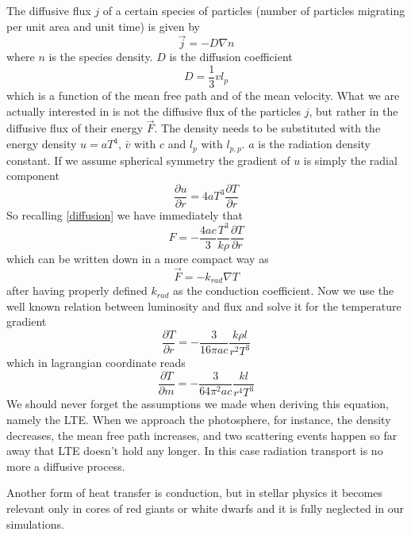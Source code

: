 The diffusive flux $j$ of a certain species of particles (number of particles migrating per unit area and unit time) is given by
\begin{equation}\label{diffusion}
	\vec  j=-D \nabla n
\end{equation}
where $n$ is the species density. $D$ is the diffusion coefficient
\begin{equation}
	D =\frac{1}{3} v l_{p}
\end{equation}
which is a function of the mean free path and of the mean velocity. What we are actually interested in is not the diffusive flux of the particles $j$, but rather in the diffusive flux of their energy $\vec F$. The density needs to be substituted with the energy density $u=aT^4$, $\bar v$ with $c$ and $l_p$ with $l_{p,p}$. $a$ is the radiation density constant. If we assume spherical symmetry the gradient of $u$ is simply the radial component
\begin{equation}
	\frac{\partial u}{\partial r} = 4  a  T^3   \frac{\partial T}{\partial r}
\end{equation}
So recalling \ref{diffusion} we have immediately that
\begin{equation}
	F=-\frac{4ac}{3}\frac{T^3}{k \rho} \frac{\partial T}{\partial r}
\end{equation}
which can be written down in a more compact way as 
\begin{equation}
	\vec F = - k_{rad} \nabla T
\end{equation}
after having properly defined $k_{rad}$ as the conduction coefficient. Now we use the well known relation between luminosity and flux and solve it for the temperature gradient
\begin{equation}
	\frac{\partial T}{\partial r}= - \frac{3}{16 \pi a c}\frac{k \rho l}{r^2 T^3}
\end{equation}
which in lagrangian coordinate reads
\begin{equation}\label{partialTpartialm}
	\frac{\partial T}{\partial m}= - \frac{3}{64 \pi^2 a c}\frac{k l}{r^4 T^3}
\end{equation}
We should never forget the assumptions we made when deriving this equation, namely the LTE. When we approach the photosphere, for instance, the density decreases, the mean free path increases, and two scattering events happen so far away that LTE doesn't hold any longer. In this case radiation transport is no more a diffusive process. 

Another form of heat transfer is conduction, but in stellar physics it becomes relevant only in cores of red giants or white dwarfs and it is fully neglected in our simulations.


